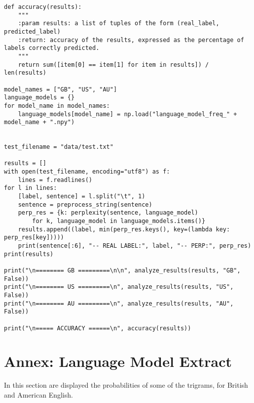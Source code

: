 \documentclass[
12pt,
a4paper,
oneside,
headinclude,
footinclude]{article}
\theoremstyle{definition} %
\begin{document}
\begin{verbatim}
def accuracy(results):
    """
    :param results: a list of tuples of the form (real_label, predicted_label)
    :return: accuracy of the results, expressed as the percentage of labels correctly predicted.
    """
    return sum([item[0] == item[1] for item in results]) / len(results)

model_names = ["GB", "US", "AU"]
language_models = {}
for model_name in model_names:
    language_models[model_name] = np.load("language_model_freq_" + model_name + ".npy")


test_filename = "data/test.txt"

results = []
with open(test_filename, encoding="utf8") as f:
    lines = f.readlines()
for l in lines:
    [label, sentence] = l.split("\t", 1)
    sentence = preprocess_string(sentence)
    perp_res = {k: perplexity(sentence, language_model) 
        for k, language_model in language_models.items()}
    results.append((label, min(perp_res.keys(), key=(lambda key: perp_res[key]))))
    print(sentence[:6], "-- REAL LABEL:", label, "-- PERP:", perp_res)
print(results)

print("\n======== GB =========\n\n", analyze_results(results, "GB", False))
print("\n======== US =========\n", analyze_results(results, "US", False))
print("\n======== AU =========\n", analyze_results(results, "AU", False))

print("\n===== ACCURACY ======\n", accuracy(results))
\end{verbatim}

\section{Annex: Language Model Extract}
In this section are displayed the probabilities of some of the trigrams, for British and American English.
\end{document}
